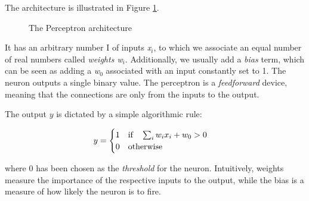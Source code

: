 The architecture is illustrated in Figure \ref{fig:rosper}.

\begin{figure}
    \centering
    
    
    \caption[The Perceptron]{The Perceptron architecture}
    \label{fig:rosper}
\end{figure}

It has an arbitrary number I of inputs \emph{x$_i$}, to which we associate an equal number of real numbers called \emph{weights w$_i$}. Additionally, we usually add a \emph{bias} term,  which can be seen as adding a \emph{w$_0$} associated with an input constantly set to 1. The neuron outputs a single binary value. The perceptron is a \emph{feedforward} device, meaning that the connections are only from the inputs to the output.

The output $y$ is dictated by a simple algorithmic rule:

\[
\centering
y = 
\begin{cases}
1 \quad \text{if} \quad \sum_i w_ix_i + w_0 > 0 \\
0 \quad \text{otherwise}
\end{cases}
\]

where $0$ has been chosen as the \emph{threshold} for the neuron. 
Intuitively, weights measure the importance of the respective inputs to the output, while the bias is a measure of how likely the neuron is to fire. 


